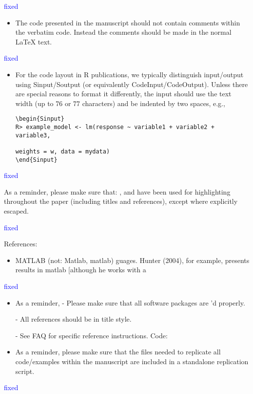 \documentclass[12pt]{article}
\begin{document}
\textcolor{blue}{fixed}

\begin{itemize}
\item The code presented in the manuscript should not contain comments
within the verbatim code. Instead the comments should be made in the
normal LaTeX text.
\end{itemize}

\textcolor{blue}{fixed}


\begin{itemize}
  \item For the code layout in R publications, we typically distinguish
input/output using Sinput/Soutput (or equivalently
CodeInput/CodeOutput). Unless there are special reasons to format it
differently, the input should use the text width (up to 76 or 77
characters) and be indented by two spaces, e.g.,

\begin{verbatim}
\begin{Sinput}
R> example_model <- lm(response ~ variable1 + variable2 + variable3,

weights = w, data = mydata)
\end{Sinput}
\end{verbatim}
\end{itemize}

\textcolor{blue}{fixed}


 As a reminder, please make sure that: \proglang, \pkg and \code have
 been used for highlighting throughout the paper (including titles and
 references), except where explicitly escaped.

\textcolor{blue}{fixed}


References:

\begin{itemize}
      \item MATLAB (not: Matlab, matlab)
guages. Hunter (2004), for example, presents results in matlab [although he works with a
\end{itemize}
\textcolor{blue}{fixed}

\begin{itemize}
\item As a reminder,
- Please make sure that all software packages are \cite{}'d properly.

- All references should be in title style.

- See FAQ for specific reference instructions.
Code:
\end{itemize}

\begin{itemize}
\item As a reminder, please make sure that the files needed to replicate
all code/examples within the manuscript are included in a standalone
replication script.
\end{itemize}
\textcolor{blue}{fixed}
\end{document}
